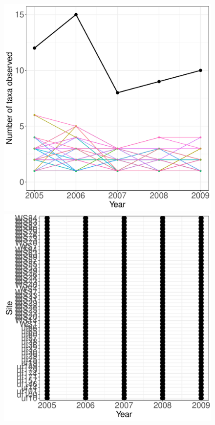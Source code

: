 \documentclass[11pt, oneside]{article}
\begin{document}
\begin{figure}[h!]
\includegraphics[scale = 0.4]{bes-birds-nilon_num_taxa_over_time.pdf}
\includegraphics[scale = 0.4]{bes-birds-nilon_spatiotemporal_sampling_effort.pdf}

\end{figure}
\end{document}
